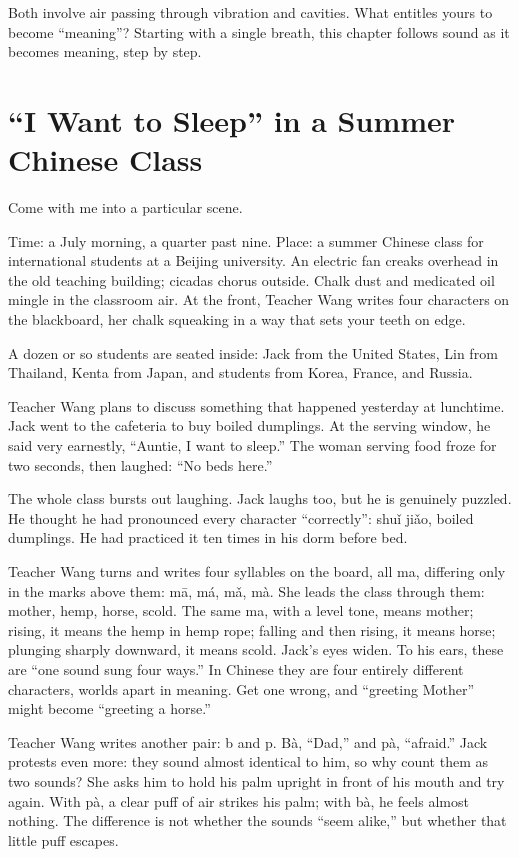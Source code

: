 Both involve air passing through vibration and cavities. What entitles yours to become ``meaning''? Starting with a single breath, this chapter follows sound as it becomes meaning, step by step.

\section{``I Want to Sleep'' in a Summer Chinese Class}
Come with me into a particular scene.

Time: a July morning, a quarter past nine. Place: a summer Chinese class for international students at a Beijing university. An electric fan creaks overhead in the old teaching building; cicadas chorus outside. Chalk dust and medicated oil mingle in the classroom air. At the front, Teacher Wang writes four characters on the blackboard, her chalk squeaking in a way that sets your teeth on edge.

A dozen or so students are seated inside: Jack from the United States, Lin from Thailand, Kenta from Japan, and students from Korea, France, and Russia.

Teacher Wang plans to discuss something that happened yesterday at lunchtime. Jack went to the cafeteria to buy boiled dumplings. At the serving window, he said very earnestly, ``Auntie, I want to sleep.'' The woman serving food froze for two seconds, then laughed: ``No beds here.''

The whole class bursts out laughing. Jack laughs too, but he is genuinely puzzled. He thought he had pronounced every character ``correctly'': shuǐ jiǎo, boiled dumplings. He had practiced it ten times in his dorm before bed.

Teacher Wang turns and writes four syllables on the board, all ma, differing only in the marks above them: mā, má, mǎ, mà. She leads the class through them: mother, hemp, horse, scold. The same ma, with a level tone, means mother; rising, it means the hemp in hemp rope; falling and then rising, it means horse; plunging sharply downward, it means scold. Jack's eyes widen. To his ears, these are ``one sound sung four ways.'' In Chinese they are four entirely different characters, worlds apart in meaning. Get one wrong, and ``greeting Mother'' might become ``greeting a horse.''

Teacher Wang writes another pair: b and p. Bà, ``Dad,'' and pà, ``afraid.'' Jack protests even more: they sound almost identical to him, so why count them as two sounds? She asks him to hold his palm upright in front of his mouth and try again. With pà, a clear puff of air strikes his palm; with bà, he feels almost nothing. The difference is not whether the sounds ``seem alike,'' but whether that little puff escapes.

